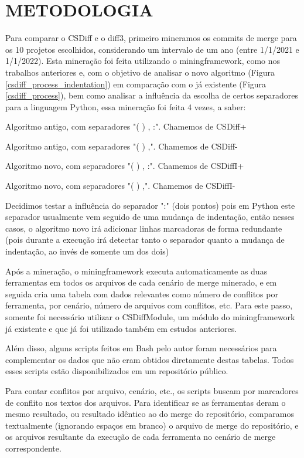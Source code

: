 \section{METODOLOGIA}\label{metodologia}
Para comparar o CSDiff e o diff3, primeiro mineramos os commits de merge para os 10 projetos escolhidos, considerando um
intervalo de um ano (entre 1/1/2021 e 1/1/2022). Esta mineração foi feita utilizando o miningframework, como nos trabalhos
anteriores e, com o objetivo de analisar o novo algoritmo (Figura \ref{csdiff_process_indentation}) em comparação com o já
existente (Figura \ref{csdiff_process}), bem como analisar a influência da escolha de certos separadores para a linguagem Python,
essa mineração foi feita 4 vezes, a saber:

\begin{compactenum}[(1)]
	\item Algoritmo antigo, com separadores "( ) , :". Chamemos de CSDiff+
	\item Algoritmo antigo, com separadores "( ) ,". Chamemos de CSDiff-
	\item Algoritmo novo, com separadores "( ) , :". Chamemos de CSDiffI+
	\item Algoritmo novo, com separadores "( ) ,". Chamemos de CSDiffI-
\end{compactenum}

Decidimos testar a influência do separador ":" (dois pontos) pois em Python este separador usualmente vem seguido de uma
mudança de indentação, então nesses casos, o algoritmo novo irá adicionar linhas marcadoras de forma redundante (pois
durante a execução irá detectar tanto o separador quanto a mudança de indentação, ao invés de somente um dos dois)

Após a mineração, o miningframework executa automaticamente as duas ferramentas em todos os arquivos de cada cenário de merge
minerado, e em seguida cria uma tabela com dados relevantes como número de conflitos por
ferramenta, por cenário, número de arquivos com conflitos, etc. Para este passo, somente foi necessário utilizar
o CSDiffModule, um módulo do miningframework já existente e que já foi utilizado também em estudos anteriores.

Além disso, alguns scripts feitos em Bash pelo autor foram necessários para complementar os dados que não eram obtidos
diretamente destas tabelas. Todos esses scripts estão disponibilizados em um repositório público. %

Para contar conflitos por arquivo,
cenário, etc., os scripts buscam por marcadores
de conflito nos textos dos arquivos. Para identificar se as ferramentas deram o mesmo resultado,
ou resultado idêntico ao do merge
do repositório, comparamos textualmente (ignorando espaços em
branco) o arquivo de merge do repositório, e os arquivos resultante da execução de cada
ferramenta no cenário de merge correspondente.

